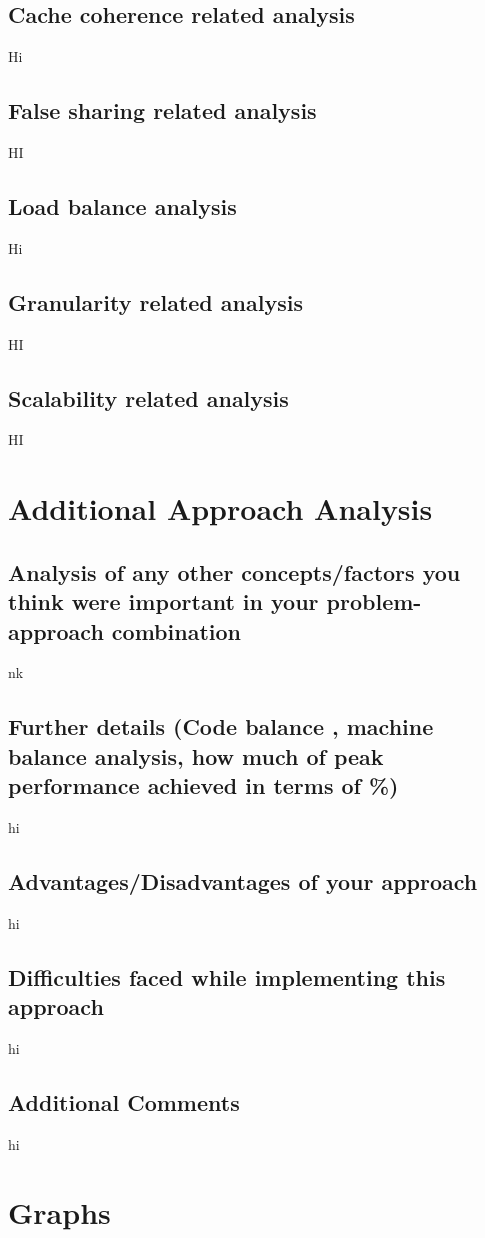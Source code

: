 \documentclass[runningheads, a4paper, oribibl]{llncs}
\begin{document}
\subsection{Cache coherence related analysis}
Hi
\subsection{False sharing related analysis}
HI
\subsection{Load balance analysis}
Hi
\subsection{Granularity related analysis}
HI
\subsection{Scalability related analysis}
HI

\section{Additional Approach Analysis}
\subsection{Analysis of any other concepts/factors you think were important in your problem-approach combination}
nk
\subsection{Further details (Code balance , machine balance analysis, how much of peak performance achieved in terms of \%)}
hi
\subsection{Advantages/Disadvantages of your approach}
hi
\subsection{Difficulties faced while implementing this approach}
hi
\subsection{Additional Comments}
hi

\section{Graphs}
\end{document}
